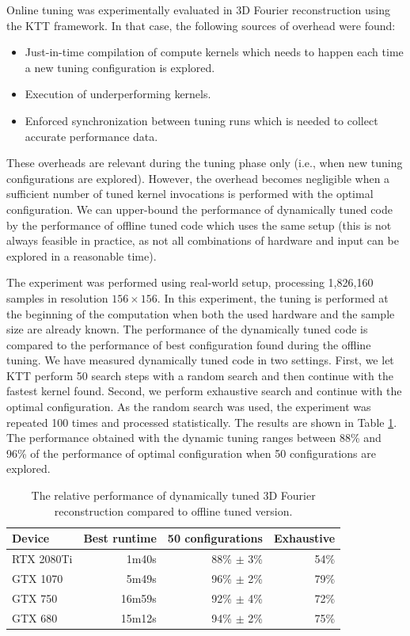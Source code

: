 \documentclass[
  digital,     %
  oneside,     %
  nosansbold,  %
  nocolorbold, %
  lof,         %
  lot,         %
  nocover
]{fithesis4}
\begin{document}
Online tuning was experimentally evaluated in 3D Fourier reconstruction using the KTT framework. In that case, the following sources of overhead were found:

\begin{itemize}
	\item Just-in-time compilation of compute kernels which needs to happen each time a new tuning configuration is explored.
	\item Execution of underperforming kernels.
	\item Enforced synchronization between tuning runs which is needed to collect accurate performance data.
\end{itemize}

These overheads are relevant during the tuning phase only (i.e., when new tuning configurations are explored). However, the overhead becomes negligible when a sufficient number of tuned kernel invocations is performed with the optimal configuration. We can upper-bound the performance of dynamically tuned code by the performance of offline tuned code which uses the same setup (this is not always feasible in practice, as not all combinations of hardware and input can be explored in a reasonable time).

The experiment was performed using real-world setup, processing 1,826,160 samples in resolution $156 \times 156$. In this experiment, the tuning is performed at the beginning of the computation when both the used hardware and the sample size are already known. The performance of the dynamically tuned code is compared to the performance of best configuration found during the offline tuning. We have measured dynamically tuned code in two settings. First, we let KTT perform 50 search steps with a random search and then continue with the fastest kernel found. Second, we perform exhaustive search and continue with the optimal configuration. As the random search was used, the experiment was repeated 100 times and processed statistically. The results are shown in Table \ref{fourier-dynamic}. The performance obtained with the dynamic tuning ranges between 88\% and 96\% of the performance of optimal configuration when 50 configurations are explored.

\begin{table}
	\centering
	\small
	\begin{tabular}{|l|r|r|r|}
		\hline
		Device & Best runtime & 50 configurations & Exhaustive\\
		\hline
		RTX 2080Ti & 1m40s  & 88\% $\pm$ 3\% & 54\% \\
		GTX 1070   & 5m49s  & 96\% $\pm$ 2\% & 79\% \\
		GTX 750    & 16m59s & 92\% $\pm$ 4\% & 72\% \\
		GTX 680	   & 15m12s & 94\% $\pm$ 2\% & 75\% \\
		\hline
	\end{tabular}
	\caption{The relative performance of dynamically tuned 3D Fourier reconstruction compared to offline tuned version.}
	\label{fourier-dynamic}
\end{table}
\end{document}
